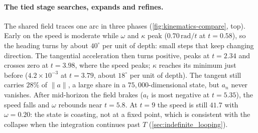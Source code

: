 \begin{table}[t]
    \centering
    \caption{Stage-3 kinematics ($R{=}100$, $N{=}500$, massive channel removed).
    Untied values inside blocks; sign flips: share of coordinates of $v$ that change
    sign across one micro-step.}
    \label{tab:kinematics}
    \small
    \setlength{\tabcolsep}{3pt}
\end{table}

\paragraph{The tied stage searches, expands and refines.}
The shared field traces one arc in three phases (\cref{fig:kinematics-compare}, top).
Early on the speed is moderate while $\omega$ and $\kappa$ peak
($0.70\,\mathrm{rad}/t$ at $t{=}0.58$), so the heading turns by about $40^\circ$ per
unit of depth: small steps that keep changing direction.
The tangential acceleration then turns positive, peaks at $t{=}2.34$ and crosses zero
at $t{=}3.98$, where the speed peaks; $\kappa$ reaches its minimum just before
($4.2{\times}10^{-3}$ at $t{=}3.79$, about $18^\circ$ per unit of depth).
The tangent still carries $28\%$ of $\|a\|$, a large share in a $75{,}000$-dimensional
state, but $a_n$ never vanishes.
After mid-horizon the field brakes ($a_t$ is most negative at $t{=}5.35$), the speed
falls and $\omega$ rebounds near $t{=}5.8$.
At $t{=}9$ the speed is still $41.7$ with $\omega{=}0.20$: the state is coasting, not
at a fixed point, which is consistent with the collapse when the integration continues
past $T$ (\cref{sec:indefinite_looping}).

